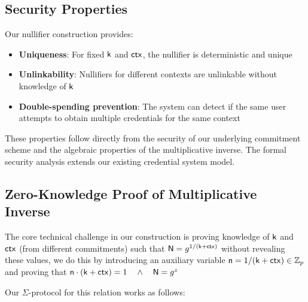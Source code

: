 \subsection{Security Properties}
Our nullifier construction provides:

\begin{itemize}
    \item \textbf{Uniqueness}: For fixed $\mathsf{k}$ and $\mathsf{ctx}$, the nullifier is deterministic and unique
    \item \textbf{Unlinkability}: Nullifiers for different contexts are unlinkable without knowledge of $\mathsf{k}$
    \item \textbf{Double-spending prevention}: The system can detect if the same user attempts to obtain multiple credentials for the same context
\end{itemize}

These properties follow directly from the security of our underlying commitment scheme and the algebraic properties of the multiplicative inverse. The formal security analysis extends our existing credential system model.



\subsection{Zero-Knowledge Proof of Multiplicative Inverse}
The core technical challenge in our construction is proving knowledge of $\mathsf{k}$ and $\mathsf{ctx}$ (from different commitments) such that $\mathsf{N} = g^{1/(\mathsf{k} + \mathsf{ctx})}$ without revealing these values, we do this by introducing an auxiliary variable $\mathsf{n} = 1/(\mathsf{k} + \mathsf{ctx}) \in \mathbb{Z}_p$ and proving that $\mathsf{n} \cdot (\mathsf{k} + \mathsf{ctx}) = 1 \quad \wedge \quad \mathsf{N} = g^z$

Our $\Sigma$-protocol for this relation works as follows:

